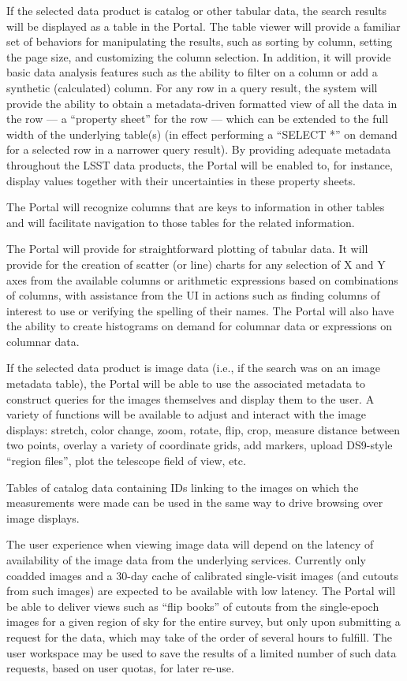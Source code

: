 If the selected data product is catalog or other tabular data, the search results will be displayed as a table in the Portal.
The table viewer will provide a familiar set of behaviors for manipulating the results, such as sorting by column, setting the page size, and customizing the column selection.
In addition, it will provide basic data analysis features such as the ability to filter on a column or add a synthetic (calculated) column.
For any row in a query result, the system will provide the ability to obtain a metadata-driven formatted view of all the data in the row --- a ``property sheet'' for the row --- which can be extended to the full width of the underlying table(s) (in effect performing a ``SELECT *'' on demand for a selected row in a narrower query result).
By providing adequate metadata throughout the LSST data products, the Portal will be enabled to, for instance, display values together with their uncertainties in these property sheets.

The Portal will recognize columns that are keys to information in other tables and will facilitate navigation to those tables for the related information.

The Portal will provide for straightforward plotting of tabular data.
It will provide for the creation of scatter (or line) charts for any selection of X and Y axes from the available columns or arithmetic expressions based on combinations of columns, with assistance from the UI in actions such as finding columns of interest to use or verifying the spelling of their names.
The Portal will also have the ability to create histograms on demand for columnar data or expressions on columnar data.

If the selected data product is image data (i.e., if the search was on an image metadata table), the Portal will be able to use the associated metadata to construct queries for the images themselves and display them to the user.
A variety of functions will be available to adjust and interact with the image displays: stretch, color change, zoom, rotate, flip, crop, measure distance between two points, overlay a variety of coordinate grids, add markers, upload DS9-style ``region files'', plot the telescope field of view, etc. 

Tables of catalog data containing IDs linking to the images on which the measurements were made can be used in the same way to drive browsing over image displays.

The user experience when viewing image data will depend on the latency of availability of the image data from the underlying services.
Currently only coadded images and a 30-day cache of calibrated single-visit images (and cutouts from such images) are expected to be available with low latency.
The Portal will be able to deliver views such as ``flip books'' of cutouts from the single-epoch images for a given region of sky for the entire survey, but only upon submitting a request for the data, which may take of the order of several hours to fulfill.
The user workspace may be used to save the results of a limited number of such data requests, based on user quotas, for later re-use.


